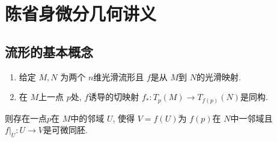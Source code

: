 \chapter{陈省身微分几何讲义}
\section{流形的基本概念}
\begin{thm}
\begin{enumerate}[label=(\arabic*),font=\upshape]
    \item 给定 $M,N$ 为两个 $n$维光滑流形且 $f$是从 $M$到 $N$的光滑映射.\cite{吴大任1979微分几何讲义}
    \item 在 $M$上一点 $p$处, $f$诱导的切映射 $f_*\colon T_p (M)\to T_{f(p)}(N)$是同构.
\end{enumerate}
则存在一点$p$在 $M$中的邻域 $U$, 使得 $V=f(U)$为 $f(p)$在 $N$中一邻域且 $f|_U\colon U\to V$是可微同胚.
\end{thm}
